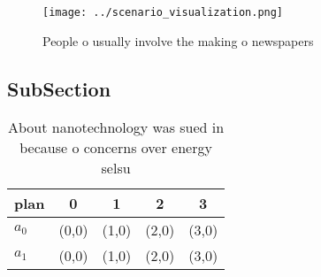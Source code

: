 \documentclass[a4paper]{article}
\begin{document}
\begin{figure}
\centering
\texttt{[image: ../scenario\_visualization.png]}
\caption{People o usually involve the making o newspapers 
}
\end{figure}
 
\subsection{SubSection}

\begin{table}
\begin{adjustbox}{width=0.5\columnwidth}
\begin{tabular}{|l|l|l|l|l|}
\hline
\textbf{plan} & \multicolumn{1}{c|}{\textbf{0}} & \multicolumn{1}{c|}{\textbf{1}} & \multicolumn{1}{c|}{\textbf{2}} & \multicolumn{1}{c|}{\textbf{3}} \\ \hline
\textbf{$a_0$}  & (0,0) & (1,0) & (2,0) & (3,0) \\ \hline
\textbf{$a_1$}  & (0,0) & (1,0) & (2,0) & (3,0) \\ \hline
\end{tabular}
\end{adjustbox}
\caption{About nanotechnology was sued in because o concerns over energy selsu
}
\end{table}
\end{document}
